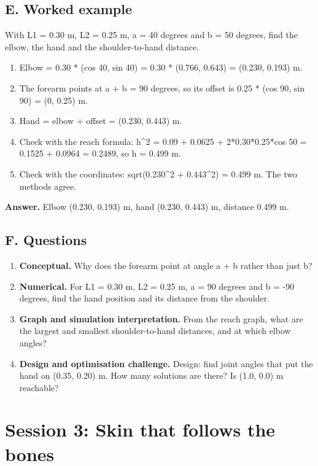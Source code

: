 \documentclass[11pt,a4paper]{article}
\begin{document}
\subsection*{E. Worked example}
With L1 = 0.30 m, L2 = 0.25 m, a = 40 degrees and b = 50 degrees, find the elbow, the hand and the shoulder-to-hand distance.
\begin{enumerate}[nosep]
\item Elbow = 0.30 * (cos 40, sin 40) = 0.30 * (0.766, 0.643) = (0.230, 0.193) m.
\item The forearm points at a + b = 90 degrees, so its offset is 0.25 * (cos 90, sin 90) = (0, 0.25) m.
\item Hand = elbow + offset = (0.230, 0.443) m.
\item Check with the reach formula: \textbar{}h\textbar{}\textasciicircum{}2 = 0.09 + 0.0625 + 2*0.30*0.25*cos 50 = 0.1525 + 0.0964 = 0.2489, so \textbar{}h\textbar{} = 0.499 m.
\item Check with the coordinates: sqrt(0.230\textasciicircum{}2 + 0.443\textasciicircum{}2) = 0.499 m. The two methods agree.
\end{enumerate}
\textbf{Answer.} Elbow (0.230, 0.193) m, hand (0.230, 0.443) m, distance 0.499 m.

\subsection*{F. Questions}
\begin{enumerate}[nosep]
\item \textbf{Conceptual.} Why does the forearm point at angle a + b rather than just b?
\item \textbf{Numerical.} For L1 = 0.30 m, L2 = 0.25 m, a = 90 degrees and b = -90 degrees, find the hand position and its distance from the shoulder.
\item \textbf{Graph and simulation interpretation.} From the reach graph, what are the largest and smallest shoulder-to-hand distances, and at which elbow angles?
\item \textbf{Design and optimisation challenge.} Design: find joint angles that put the hand on (0.35, 0.20) m. How many solutions are there? Is (1.0, 0.0) m reachable?
\end{enumerate}

\section{Session 3: Skin that follows the bones}
\end{document}
